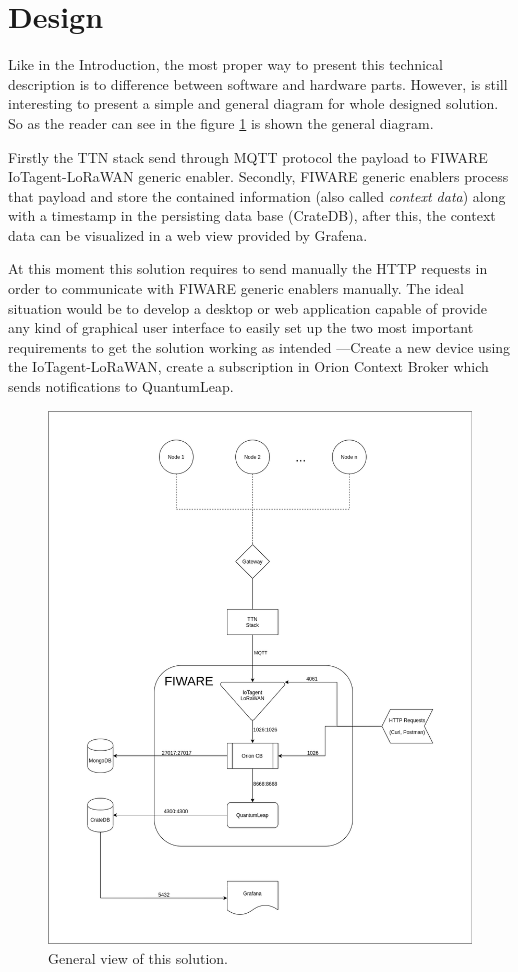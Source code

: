 \documentclass[11pt,a4paper,dvipsnames,twoside]{article}
\begin{document}
\newpage
\section{Design}\thispagestyle{plain}
Like in the Introduction, the most proper way to present this technical description is to difference between software and hardware parts. However, is still interesting to present a simple and general diagram for whole designed solution. So as the reader can see in the figure \ref{fig:GenView} is shown the general diagram. 

Firstly the TTN stack send through MQTT protocol the payload to FIWARE IoTagent-LoRaWAN generic enabler. Secondly, FIWARE generic enablers process that payload and store the contained information (also called \textit{context data}) along with a timestamp in the persisting data base (CrateDB), after this, the context data can be visualized in a web view provided by Grafena. 

At this moment this solution requires to send manually the HTTP requests in order to communicate with FIWARE generic enablers manually. The ideal situation would be to develop a desktop or web application capable of provide any kind of graphical user interface to easily set up the two most important requirements to get the solution working as intended ---Create a new device using the IoTagent-LoRaWAN, create a subscription in Orion Context Broker which sends notifications to QuantumLeap.

\begin{figure}[htp]
  \centering
  \includegraphics[width=\textwidth]{../schemes/main_scheme_tbg.png}
  \caption{General view of this solution.}
  \label{fig:GenView}
\end{figure}
\end{document}

